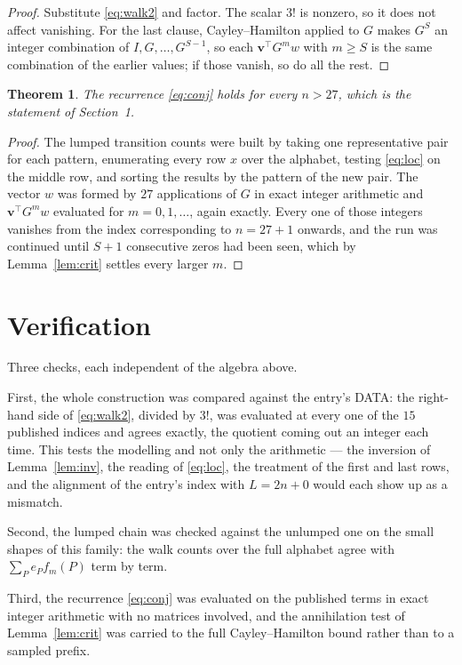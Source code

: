 \documentclass[11pt,a4paper]{article}
\theoremstyle{plain}
\newtheorem{theorem}{Theorem}
\theoremstyle{definition}
\begin{document}
\begin{proof}
Substitute \eqref{eq:walk2} and factor. The scalar $3!$ is nonzero, so it does not
affect vanishing. For the last clause, Cayley--Hamilton applied to $G$ makes $G^{S}$ an
integer combination of $I,G,\dots,G^{S-1}$, so each $\mathbf{v}^{\!\top}G^{m}w$ with
$m\ge S$ is the same combination of the earlier values; if those vanish, so do all the rest.
\end{proof}

\begin{theorem}
The recurrence \eqref{eq:conj} holds for every $n>27$, which is the statement of
Section~1.
\end{theorem}

\begin{proof}
The lumped transition counts were built by taking one representative pair for each pattern,
enumerating every row $x$ over the alphabet, testing \eqref{eq:loc} on the middle
row, and sorting the results by the pattern of the new pair. The vector $w$ was formed by
$27$ applications of $G$ in exact integer arithmetic and $\mathbf{v}^{\!\top}G^{m}w$
evaluated for $m=0,1,\dots$, again exactly. Every one of those integers vanishes from the
index corresponding to $n=27+1$ onwards, and the run was continued until $S+1$
consecutive zeros had been seen, which by Lemma~\ref{lem:crit} settles every larger $m$.
\end{proof}

\section{Verification}

Three checks, each independent of the algebra above.

First, the whole construction was compared against the entry's DATA: the right-hand side of
\eqref{eq:walk2}, divided by $3!$, was evaluated at every one of the $15$
published indices and agrees exactly, the quotient coming out an integer each time. This
tests the modelling and not only the arithmetic --- the inversion of Lemma~\ref{lem:inv},
the reading of \eqref{eq:loc}, the treatment of the first and last rows, and the
alignment of the entry's index with $L=2n+0$ would each show up as a mismatch.

Second, the lumped chain was checked against the unlumped one on the small shapes of this
family: the walk counts over the full alphabet agree with $\sum_P e_Pf_m(P)$ term by term.

Third, the recurrence \eqref{eq:conj} was evaluated on the published terms in exact integer
arithmetic with no matrices involved, and the annihilation test of Lemma~\ref{lem:crit} was
carried to the full Cayley--Hamilton bound rather than to a sampled prefix.
\end{document}
